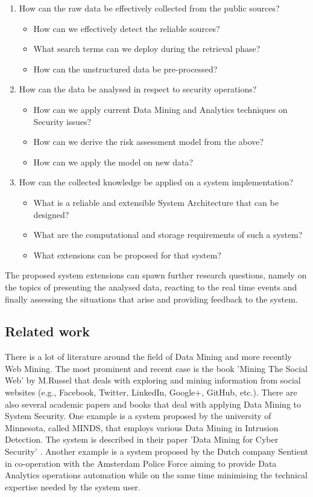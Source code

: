 \documentclass[12pt]{article}
\begin{document}
\begin{enumerate}
	\item How can the raw data be effectively collected from the public sources? 
	\begin{itemize}
		\item How can we effectively detect the reliable sources?
		\item What search terms can we deploy during the retrieval phase?
		\item How can the unstructured data be pre-processed? 
	\end{itemize}
	\item How can the data be analysed in respect to security operations?
	\begin{itemize}
		\item How can we apply current Data Mining and Analytics techniques on Security issues?
		\item How can we derive the risk assessment model from the above?
		\item How can we apply the model on new data?
	\end{itemize}
	\item	How can the collected knowledge be applied on a system implementation?
	\begin{itemize}
		\item What is a reliable and extensible System Architecture that can be designed?
		\item What are the computational and storage requirements of such a system?
		\item What extensions can be proposed for that system?
	\end{itemize}
\end{enumerate}

The proposed system extensions can spawn further research questions, namely on the topics of presenting the analysed data, reacting to the real time events and finally assessing the situations that arise and providing feedback to the system.


\subsection{Related work}
There is a lot of literature around the field of Data Mining and more recently Web Mining. The most prominent and recent case is the book 'Mining The Social Web' by M.Russel \cite{socialweb} that deals with exploring and mining information from social websites (e.g., Facebook, Twitter, LinkedIn, Google+, GitHub, etc.). There are also several academic papers and books that deal with applying Data Mining to System Security. One example is a system proposed by the university of Minnesota, called MINDS, that employs various Data Mining in Intrusion Detection. The system is described in their paper 'Data Mining for Cyber Security' \cite{minds}.  Another example is a system proposed by the Dutch company Sentient in co-operation with the Amsterdam Police Force \cite{police} aiming to provide Data Analytics operations automation while on the same time minimising the technical expertise needed by the system user. 
\end{document}
